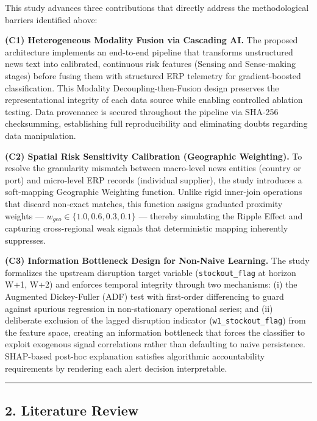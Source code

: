 \documentclass[conference]{IEEEtran}
\begin{document}
This study advances three contributions that directly address the
methodological barriers identified above:

\textbf{(C1) Heterogeneous Modality Fusion via Cascading AI.} The
proposed architecture implements an end-to-end pipeline that transforms
unstructured news text into calibrated, continuous risk features
(Sensing and Sense-making stages) before fusing them with structured ERP
telemetry for gradient-boosted classification. This Modality
Decoupling-then-Fusion design preserves the representational integrity
of each data source while enabling controlled ablation testing. Data
provenance is secured throughout the pipeline via SHA-256 checksumming,
establishing full reproducibility and eliminating doubts regarding data
manipulation.

\textbf{(C2) Spatial Risk Sensitivity Calibration (Geographic
Weighting).} To resolve the granularity mismatch between macro-level
news entities (country or port) and micro-level ERP records (individual
supplier), the study introduces a soft-mapping Geographic Weighting
function. Unlike rigid inner-join operations that discard non-exact
matches, this function assigns graduated proximity weights ---
\(w_{geo} \in \{1.0, 0.6, 0.3, 0.1\}\) --- thereby simulating the Ripple
Effect and capturing cross-regional weak signals that deterministic
mapping inherently suppresses.

\textbf{(C3) Information Bottleneck Design for Non-Naive Learning.} The
study formalizes the upstream disruption target variable
(\texttt{stockout\_flag} at horizon W+1, W+2) and enforces temporal
integrity through two mechanisms: (i) the Augmented Dickey-Fuller (ADF)
test with first-order differencing to guard against spurious regression
in non-stationary operational series; and (ii) deliberate exclusion of
the lagged disruption indicator (\texttt{w1\_stockout\_flag}) from the
feature space, creating an information bottleneck that forces the
classifier to exploit exogenous signal correlations rather than
defaulting to naive persistence. SHAP-based post-hoc explanation
satisfies algorithmic accountability requirements by rendering each
alert decision interpretable.

\begin{center}\rule{0.5\linewidth}{0.5pt}\end{center}

\subsection{2. Literature Review}\label{literature-review}
\end{document}
